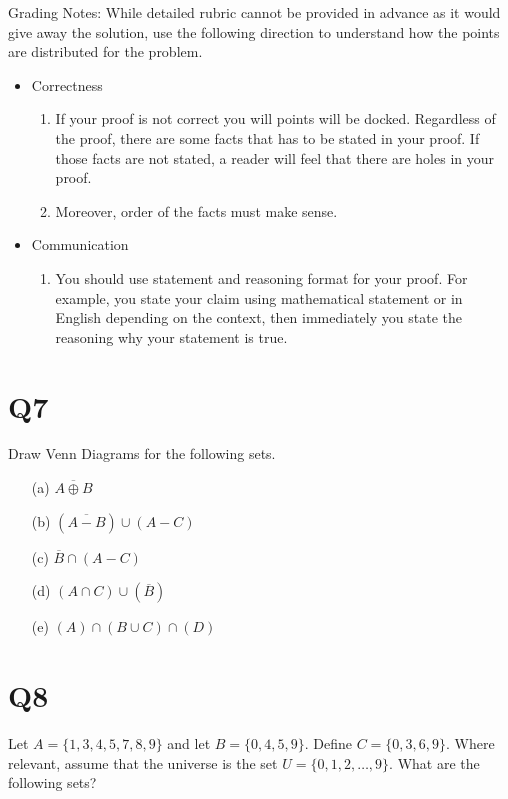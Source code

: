 \documentclass[12pt]{exam}
\begin{document}
Grading Notes:
While detailed rubric cannot be provided in advance as it would give away the solution, use the following direction to understand how the points are distributed for the problem.
\begin{itemize}
    \item Correctness
    \begin{enumerate}
        \item If your proof is not correct you will points will be docked. Regardless of the proof, there are some facts that has to be stated in your proof. If those facts are not stated, a reader will feel that there are holes in your proof. 
        \item Moreover, order of the facts must make sense. 
    \end{enumerate}
        
    \item Communication 
        \begin{enumerate}
            \item You should use statement and reasoning format for your proof. For example, you state your claim using mathematical statement or in English depending on the context, then immediately you state the reasoning why your statement is true.
        \end{enumerate}
\end{itemize}

\section{Q7}
Draw Venn Diagrams for the following sets. 

\begin{enumerate}
    \item [(a)] $\overline{A \oplus B}$
    \item [(b)] $(\overline{A - B}) \cup (A - C)$
    \item [(c)] $\overline{B} \cap (A - C)$
    \item [(d)] $(A \cap C) \cup (\overline{B}) $
    \item [(e)] $(A) \cap (B \cup C) \cap (D)$
\end{enumerate}

\section{Q8}
Let $A = \{1, 3, 4, 5, 7, 8, 9\}$ and let $B = \{0, 4, 5, 9\}.$ Define $C = \{0, 3, 6, 9\}$. Where relevant, assume that the universe is the set $U = \{0, 1, 2, \ldots, 9\}$. What are the following sets?
\end{document}
